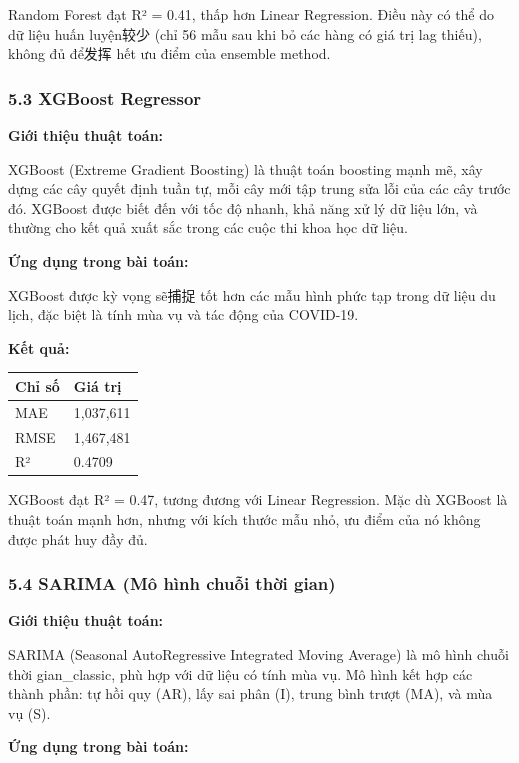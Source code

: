 \documentclass[11pt]{article}
\begin{document}
Random Forest đạt R² = 0.41, thấp hơn Linear Regression. Điều này có thể
do dữ liệu huấn luyện较少 (chỉ 56 mẫu sau khi bỏ các hàng có giá trị lag
thiếu), không đủ để发挥 hết ưu điểm của ensemble method.

\subsubsection{5.3 XGBoost Regressor}\label{xgboost-regressor}

\textbf{Giới thiệu thuật toán:}

XGBoost (Extreme Gradient Boosting) là thuật toán boosting mạnh mẽ, xây
dựng các cây quyết định tuần tự, mỗi cây mới tập trung sửa lỗi của các
cây trước đó. XGBoost được biết đến với tốc độ nhanh, khả năng xử lý dữ
liệu lớn, và thường cho kết quả xuất sắc trong các cuộc thi khoa học dữ
liệu.

\textbf{Ứng dụng trong bài toán:}

XGBoost được kỳ vọng sẽ捕捉 tốt hơn các mẫu hình phức tạp trong dữ liệu
du lịch, đặc biệt là tính mùa vụ và tác động của COVID-19.

\textbf{Kết quả:}

\begin{longtable}[]{@{}ll@{}}
\toprule\noalign{}
Chỉ số & Giá trị \\
\midrule\noalign{}
\endhead
\bottomrule\noalign{}
\endlastfoot
MAE & 1,037,611 \\
RMSE & 1,467,481 \\
R² & 0.4709 \\
\end{longtable}

XGBoost đạt R² = 0.47, tương đương với Linear Regression. Mặc dù XGBoost
là thuật toán mạnh hơn, nhưng với kích thước mẫu nhỏ, ưu điểm của nó
không được phát huy đầy đủ.

\subsubsection{5.4 SARIMA (Mô hình chuỗi thời
gian)}\label{sarima-muxf4-huxecnh-chuux1ed7i-thux1eddi-gian}

\textbf{Giới thiệu thuật toán:}

SARIMA (Seasonal AutoRegressive Integrated Moving Average) là mô hình
chuỗi thời gian\_classic, phù hợp với dữ liệu có tính mùa vụ. Mô hình
kết hợp các thành phần: tự hồi quy (AR), lấy sai phân (I), trung bình
trượt (MA), và mùa vụ (S).

\textbf{Ứng dụng trong bài toán:}
\end{document}
